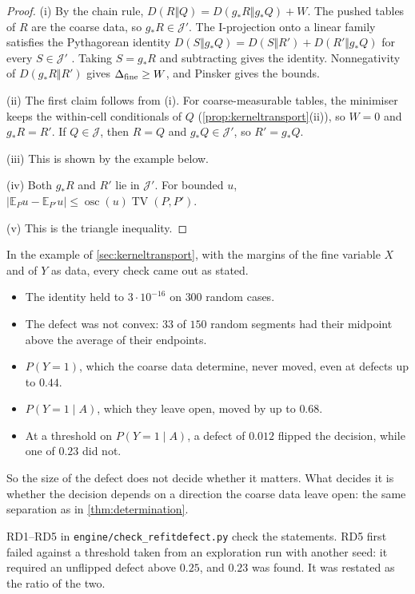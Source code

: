 \documentclass[11pt]{article}
\theoremstyle{definition}\newtheorem{definition}[theorem]{Definition}\newtheorem{remark}[theorem]{Remark}\newtheorem{example}[theorem]{Example}\newtheorem{problem}[theorem]{Open problem}\crefname{problem}{Problem}{Problems}
\begin{document}
\begin{proof}
(i) By the chain rule, $D(R\Vert Q)=D(g_*R\Vert g_*Q)+W$. The pushed tables of $R$ are the coarse data, so $g_*R\in\mathcal J'$. The I-projection onto a linear family satisfies the Pythagorean identity $D(S\Vert g_*Q)=D(S\Vert R')+D(R'\Vert g_*Q)$ for every $S\in\mathcal J'$ \cite{Csiszar1975}. Taking $S=g_*R$ and subtracting gives the identity. Nonnegativity of $D(g_*R\Vert R')$ gives $\Delta_{\rm fine}\ge W$, and Pinsker gives the bounds.

(ii) The first claim follows from (i). For coarse-measurable tables, the minimiser keeps the within-cell conditionals of $Q$ (\cref{prop:kerneltransport}(ii)), so $W=0$ and $g_*R=R'$. If $Q\in\mathcal J$, then $R=Q$ and $g_*Q\in\mathcal J'$, so $R'=g_*Q$.

(iii) This is shown by the example below.

(iv) Both $g_*R$ and $R'$ lie in $\mathcal J'$. For bounded $u$, $|\mathbb E_Pu-\mathbb E_{P'}u|\le\operatorname{osc}(u)\operatorname{TV}(P,P')$.

(v) This is the triangle inequality.
\end{proof}

In the example of \cref{sec:kerneltransport}, with the margins of the fine variable $X$ and of $Y$ as data, every check came out as stated.
\begin{itemize}
\item The identity held to $3\cdot10^{-16}$ on $300$ random cases.
\item The defect was not convex: $33$ of $150$ random segments had their midpoint above the average of their endpoints.
\item $P(Y{=}1)$, which the coarse data determine, never moved, even at defects up to $0.44$.
\item $P(Y{=}1\mid A)$, which they leave open, moved by up to $0.68$.
\item At a threshold on $P(Y{=}1\mid A)$, a defect of $0.012$ flipped the decision, while one of $0.23$ did not.
\end{itemize}

So the size of the defect does not decide whether it matters. What decides it is whether the decision depends on a direction the coarse data leave open: the same separation as in \cref{thm:determination}.

RD1--RD5 in \texttt{engine/check\_refitdefect.py} check the statements. RD5 first failed against a threshold taken from an exploration run with another seed: it required an unflipped defect above $0.25$, and $0.23$ was found. It was restated as the ratio of the two.
\end{document}
